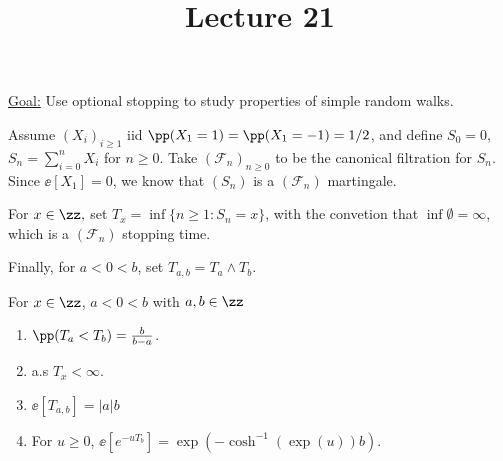 \documentclass[../main.tex]{subfiles}
\title{Lecture 21}
\begin{document}
  \underline{Goal:} Use optional stopping to study properties of simple random walks.

  Assume $(X_i)_{i \geq 1}$ iid $\pp(X_1 = 1) = \pp(X_1 = -1) = 1/2$, and define
  $S_0 = 0$, $S_n = \sum_{i=0}^n X_i$ for $n \geq 0$. Take $(\mathcal{F}_n)_{n
  \geq 0}$ to be the canonical filtration for $S_n$. Since $\ee[X_1] = 0$, we
  know that $(S_n)$ is a $(\mathcal{F}_n)$ martingale.

  For $x \in \zz,$ set $T_x = \inf \{ n \geq 1 \colon S_n = x \} $, with the
  convetion that $\inf \emptyset = \infty$, which is a $(\mathcal{F}_n)$
  stopping time.

  Finally, for $a < 0 < b$, set $T_{a, b} = T_a \wedge T_b$.

  \begin{proposition}
      For $x \in \zz$, $a < 0 < b$ with $a, b \in \zz$
      \begin{enumerate}
        \item $\pp(T_a < T_b) = \frac{b}{b - a} $.
        \item a.s $T_x < \infty$.
        \item $\ee[T_{a, b}] = |a| b$
        \item For $u \geq 0$, $\ee[e^{-uT_b}] = \exp(- \cosh^{-1}(\exp(u))b)$.
      \end{enumerate}
  \end{proposition}
\end{document}
